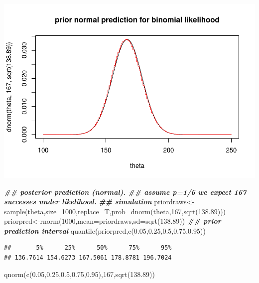 \documentclass[
]{book}
\newenvironment{Shaded}{\begin{snugshade}}{\end{snugshade}}
\newcommand{\AttributeTok}[1]{\textcolor[rgb]{0.77,0.63,0.00}{#1}}
\newcommand{\DecValTok}[1]{\textcolor[rgb]{0.00,0.00,0.81}{#1}}
\newcommand{\DocumentationTok}[1]{\textcolor[rgb]{0.56,0.35,0.01}{\textbf{\textit{#1}}}}
\newcommand{\FloatTok}[1]{\textcolor[rgb]{0.00,0.00,0.81}{#1}}
\newcommand{\FunctionTok}[1]{\textcolor[rgb]{0.00,0.00,0.00}{#1}}
\newcommand{\NormalTok}[1]{#1}
\newcommand{\OtherTok}[1]{\textcolor[rgb]{0.56,0.35,0.01}{#1}}
\theoremstyle{definition}
\theoremstyle{definition}
\theoremstyle{definition}
\theoremstyle{definition}
\theoremstyle{remark}
\begin{document}
\includegraphics{_main_files/figure-latex/unnamed-chunk-13-1.pdf}

\begin{Shaded}
\begin{Highlighting}[]
  \DocumentationTok{\#\# posterior prediction (normal).}
     \DocumentationTok{\#\# assume p=1/6 we expect 167 successes under likelihood.}
\DocumentationTok{\#\# simulation     }
\NormalTok{     priordraws}\OtherTok{\textless{}{-}}\FunctionTok{sample}\NormalTok{(theta,}\AttributeTok{size=}\DecValTok{1000}\NormalTok{,}\AttributeTok{replace=}\NormalTok{T,}\AttributeTok{prob=}\FunctionTok{dnorm}\NormalTok{(theta,}\DecValTok{167}\NormalTok{,}\FunctionTok{sqrt}\NormalTok{(}\FloatTok{138.89}\NormalTok{)))}
\NormalTok{     priorpred}\OtherTok{\textless{}{-}}\FunctionTok{rnorm}\NormalTok{(}\DecValTok{1000}\NormalTok{,}\AttributeTok{mean=}\NormalTok{priordraws,}\AttributeTok{sd=}\FunctionTok{sqrt}\NormalTok{(}\FloatTok{138.89}\NormalTok{))}
     \DocumentationTok{\#\# prior prediction interval}
     \FunctionTok{quantile}\NormalTok{(priorpred,}\FunctionTok{c}\NormalTok{(}\FloatTok{0.05}\NormalTok{,}\FloatTok{0.25}\NormalTok{,}\FloatTok{0.5}\NormalTok{,}\FloatTok{0.75}\NormalTok{,}\FloatTok{0.95}\NormalTok{))}
\end{Highlighting}
\end{Shaded}

\begin{verbatim}
##       5%      25%      50%      75%      95% 
## 136.7614 154.6273 167.5061 178.8781 196.7024
\end{verbatim}

\begin{Shaded}
\begin{Highlighting}[]
     \FunctionTok{qnorm}\NormalTok{(}\FunctionTok{c}\NormalTok{(}\FloatTok{0.05}\NormalTok{,}\FloatTok{0.25}\NormalTok{,}\FloatTok{0.5}\NormalTok{,}\FloatTok{0.75}\NormalTok{,}\FloatTok{0.95}\NormalTok{),}\DecValTok{167}\NormalTok{,}\FunctionTok{sqrt}\NormalTok{(}\FloatTok{138.89}\NormalTok{))}
\end{Highlighting}
\end{Shaded}
\end{document}
